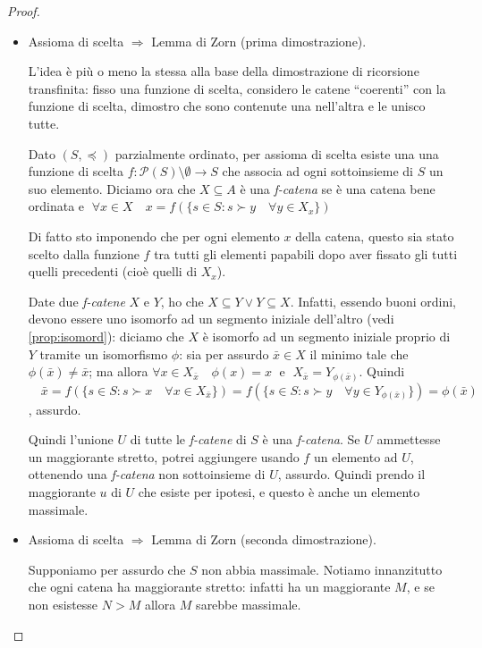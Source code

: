 \documentclass[a4paper,10pt,oneside]{article}
\newcommand{\myname}[1]{\emph{#1}}
\theoremstyle{plain}
\theoremstyle{definition}
\theoremstyle{remark}
\begin{document}
\begin{proof}\
\begin{itemize}
 \item Assioma di scelta $\Rightarrow$ Lemma di Zorn (prima dimostrazione).
 
 L'idea è più o meno la stessa alla base della dimostrazione di ricorsione transfinita: fisso una funzione di scelta, considero le catene ``coerenti'' con la funzione di scelta, dimostro che sono contenute una nell'altra e le unisco tutte.
 
 Dato $(S,\preceq)$ parzialmente ordinato, per assioma di scelta esiste una una funzione di scelta $f: \mathcal P (S)\setminus{\emptyset} \rightarrow S$ che associa ad ogni sottoinsieme di $S$ un suo elemento. Diciamo ora che $X\subseteq A$ è una \myname{f-catena} se è una catena bene ordinata e $\; \forall x\in X \quad x=f(\{s\in S: s\succ y \quad \forall y\in X_x\})$
 
 Di fatto sto imponendo che per ogni elemento $x$ della catena, questo sia stato scelto dalla funzione $f$ tra tutti gli elementi papabili dopo aver fissato gli tutti quelli precedenti (cioè quelli di $X_x$).
 
 Date due \myname{f-catene} $X$ e $Y$, ho che $X\subseteq Y \vee Y\subseteq X$. Infatti, essendo buoni ordini, devono essere uno isomorfo ad un segmento iniziale dell'altro (vedi \ref{prop:isomord}): diciamo che $X$ è isomorfo ad un segmento iniziale proprio di $Y$ tramite un isomorfismo $\phi$: sia per assurdo $\bar x\in X$ il minimo tale che $\phi(\bar x)\not = \bar x$; ma allora $\forall x\in X_{\bar x} \quad \phi(x)=x \;$ e $\; X_{\bar x}=Y_{\phi(\bar x)}$. Quindi $\quad\bar x=f(\{s\in S:s\succ x \quad \forall x\in X_{\bar x}\})=f(\{s\in S:s\succ y \quad \forall y\in Y_{\phi(\bar x)}\})=\phi(\bar x)$, assurdo.
 
 Quindi l'unione $U$ di tutte le \myname{f-catene} di $S$ è una \myname{f-catena}. Se $U$ ammettesse un maggiorante stretto, potrei aggiungere usando $f$ un elemento ad $U$, ottenendo una \myname{f-catena} non sottoinsieme di $U$, assurdo. Quindi prendo il maggiorante $u$ di $U$ che esiste per ipotesi, e questo è anche un elemento massimale.
 
 \item Assioma di scelta $\Rightarrow$ Lemma di Zorn (seconda dimostrazione).
 
 Supponiamo per assurdo che $S$ non abbia massimale. Notiamo innanzitutto che ogni catena ha maggiorante stretto: infatti ha un maggiorante $M$, e se non esistesse $N>M$ allora $M$ sarebbe massimale.
	

\end{itemize}
\end{proof}
\end{document}

